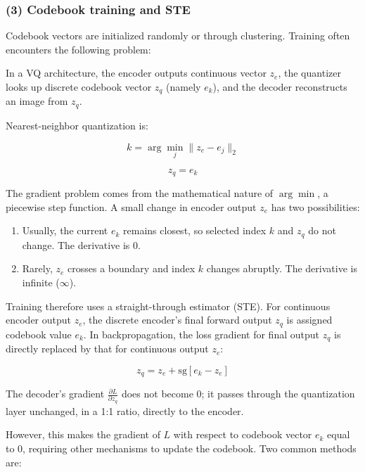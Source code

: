 \hypertarget{codebook-training-and-ste}{%
\subsubsection{(3) Codebook training and STE}\label{codebook-training-and-ste}}

Codebook vectors are initialized randomly or through clustering. Training often encounters the following problem:

In a VQ architecture, the encoder outputs continuous vector \(z_e\), the quantizer looks up discrete codebook vector \(z_q\) (namely \(e_k\)), and the decoder reconstructs an image from \(z_q\).

Nearest-neighbor quantization is:

\[
k=\arg\min_j\lVert z_e-e_j\rVert_2
\]

\[
z_q=e_k
\]

The gradient problem comes from the mathematical nature of \(\arg\min\), a piecewise step function. A small change in encoder output \(z_e\) has two possibilities:

\begin{enumerate}
\def\labelenumi{\arabic{enumi}.}
\tightlist
\item
  Usually, the current \(e_k\) remains closest, so selected index \(k\) and \(z_q\) do not change. The derivative is 0.
\item
  Rarely, \(z_e\) crosses a boundary and index \(k\) changes abruptly. The derivative is infinite (\(\infty\)).
\end{enumerate}

Training therefore uses a straight-through estimator (STE). For continuous encoder output \(z_e\), the discrete encoder's final forward output \(z_q\) is assigned codebook value \(e_k\). In backpropagation, the loss gradient for final output \(z_q\) is directly replaced by that for continuous output \(z_e\):

\[
z_q=z_e+\mathrm{sg}[e_k-z_e]
\]

The decoder's gradient \(\frac{\partial L}{\partial z_q}\) does not become 0; it passes through the quantization layer unchanged, in a 1:1 ratio, directly to the encoder.

However, this makes the gradient of \(L\) with respect to codebook vector \(e_k\) equal to 0, requiring other mechanisms to update the codebook. Two common methods are:

